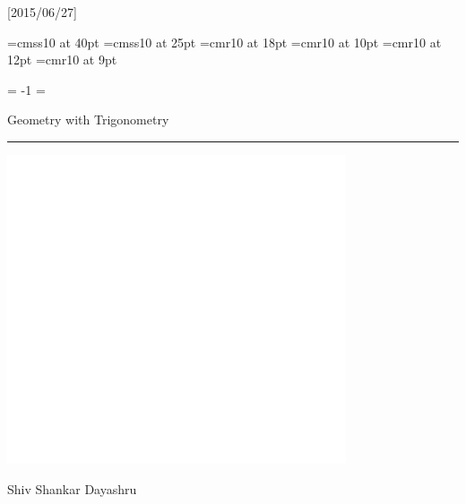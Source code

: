 

\beginpackages
  \usepackage{url}[2015/06/27]
  \usepackage[dvipsnames]{color}
  \usepackage{graphicx}
\endpackages
\enablehyperlinks
{}

\font\titlefont=cmss10 at 40pt
\font\subtitlefont=cmss10 at 25pt
\font\authorfont=cmr10 at 18pt
\font\chaptitlefont=cmr10 at 10pt
\font\partfont=cmr10 at 12pt
\font\sectionfont=cmr10 at 9pt

\pdfpagewidth=210mm
\pdfpageheight=297mm
\paperwidth=210mm
\paperheight=297mm

\pageno = -1
\begingroup
  \nopagenumbers
  \headline={\kern-2in}
  ~~~
  \vskip 2cm
  \titlefont\centerline{\color{white}Geometry with
Trigonometry}
  \vskip 2mm
  {\color{white}\hrule}
  \vskip 2mm
  \subtitlefont{}
  \vskip 1.5cm
  \centerline{\includegraphics[width=10cm]{images/nine-point-circle}}
  \vfill
  \authorfont\color{white}Shiv Shankar Dayashru
  \color{black}
  \vfil
  \eject
\endgroup
\color{black}

\rewritetocfiletrue %
\completebooktrue
\edgetabsfalse
%
\noheadlinetrue
\sinkage

